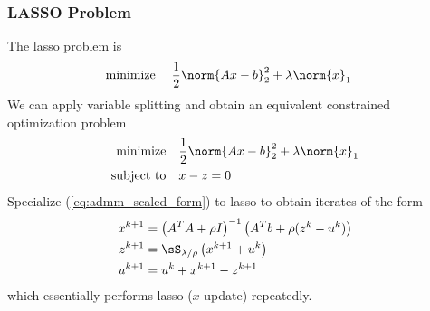 \documentclass[../writeup.tex]{subfiles}
\begin{document}
\subsubsection{LASSO Problem}

The lasso problem is 
\begin{align}
    \minimize\;
        & \frac{1}{2} \norm{Ax-b}_2^2 + \lambda \norm{x}_1
    \label{eq:lasso_unconstrained_problem}
\end{align}
We can apply variable splitting and obtain an equivalent constrained optimization problem
\begin{align}
    \minimize
        & \frac{1}{2} \norm{Ax-b}_2^2 + \lambda \norm{x}_1 \\
    \subjectto
        & x - z = 0
    \label{eq:lasso_unconstrained_problem}
\end{align}
Specialize (\ref{eq:admm_scaled_form}) to lasso to obtain iterates of the form
\begin{align}
    x^{k+1}
        &= \left( A^TA + \rho I \right)^{-1} \left( A^Tb + \rho(z^{k} - u^k) \right) \\
    z^{k+1}
        &= \sS_{\lambda/\rho} \left( x^{k+1} + u^k \right) \\
    u^{k+1}
        &= u^k + x^{k+1} - z^{k+1}
\end{align}
which essentially performs lasso ($x$ update) repeatedly.
\end{document}
